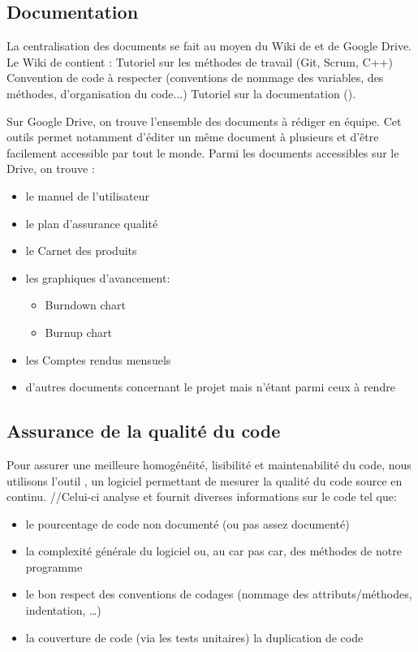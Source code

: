 \subsection{Documentation}
La centralisation des documents se fait au moyen du Wiki de  et de Google Drive. 
Le Wiki de  contient :
Tutoriel sur les méthodes de travail (Git, Scrum, C++)
Convention de code à respecter (conventions de nommage des variables, des méthodes, d’organisation du code...)
Tutoriel sur la documentation ().

Sur Google Drive, on trouve l’ensemble des documents à rédiger en équipe. Cet outils permet notamment d’éditer un même document à plusieurs et d’être facilement accessible par tout le monde. Parmi les documents accessibles sur le Drive, on trouve :
\begin{itemize}
	\item le manuel de l’utilisateur
	\item le plan d'assurance qualité
	\item le Carnet des produits 
	\item les graphiques d’avancement:
	\begin{itemize}
		\item Burndown chart
		\item Burnup chart
	\end{itemize}
	\item les Comptes rendus mensuels
	\item d’autres documents concernant le projet mais n’étant parmi ceux à rendre
\end{itemize}
 
\subsection{Assurance de la qualité du code}
Pour assurer une meilleure homogénéité, lisibilité et maintenabilité du code, nous utilisons l’outil , un logiciel permettant de mesurer la qualité du code source  en continu. 
//Celui-ci analyse et fournit diverses informations sur le code tel que:
\begin{itemize}
	\item le pourcentage de code non documenté (ou pas assez documenté)
	\item la complexité générale du logiciel ou, au car pas car, des méthodes de notre programme
	\item le bon respect des conventions de codages (nommage des attributs/méthodes, indentation, …)
	\item la couverture de code (via les tests unitaires) la duplication de code
\end{itemize}
